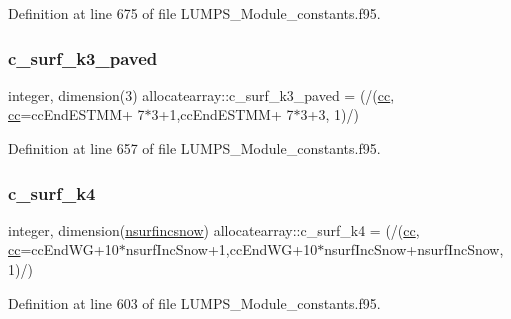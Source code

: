 Definition at line 675 of file L\+U\+M\+P\+S\+\_\+\+Module\+\_\+constants.\+f95.

\mbox{\label{namespaceallocatearray_acf3af91d0a1eb59078343da9f4395d34}} 
\subsubsection{\texorpdfstring{c\+\_\+surf\+\_\+k3\+\_\+paved}{c\_surf\_k3\_paved}}
{\footnotesize\ttfamily integer, dimension(3) allocatearray\+::c\+\_\+surf\+\_\+k3\+\_\+paved = (/(\hyperlink{namespaceallocatearray_ac863c81704eb507dee10f5e10741e10c}{cc}, \hyperlink{namespaceallocatearray_ac863c81704eb507dee10f5e10741e10c}{cc}=cc\+End\+E\+S\+T\+MM+ 7$\ast$3+1,cc\+End\+E\+S\+T\+MM+ 7$\ast$3+3, 1)/)}



Definition at line 657 of file L\+U\+M\+P\+S\+\_\+\+Module\+\_\+constants.\+f95.

\mbox{\label{namespaceallocatearray_ad37f821b9c923544adca4561e173b0ec}} 
\subsubsection{\texorpdfstring{c\+\_\+surf\+\_\+k4}{c\_surf\_k4}}
{\footnotesize\ttfamily integer, dimension(\hyperlink{namespaceallocatearray_af4d113f332b6759cfa22271140c9162d}{nsurfincsnow}) allocatearray\+::c\+\_\+surf\+\_\+k4 = (/(\hyperlink{namespaceallocatearray_ac863c81704eb507dee10f5e10741e10c}{cc}, \hyperlink{namespaceallocatearray_ac863c81704eb507dee10f5e10741e10c}{cc}=cc\+End\+WG+10$\ast$nsurf\+Inc\+Snow+1,cc\+End\+WG+10$\ast$nsurf\+Inc\+Snow+nsurf\+Inc\+Snow, 1)/)}



Definition at line 603 of file L\+U\+M\+P\+S\+\_\+\+Module\+\_\+constants.\+f95.

\mbox{\label{namespaceallocatearray_ab35400b9c31346e3dd010b2e83f542be}} 
